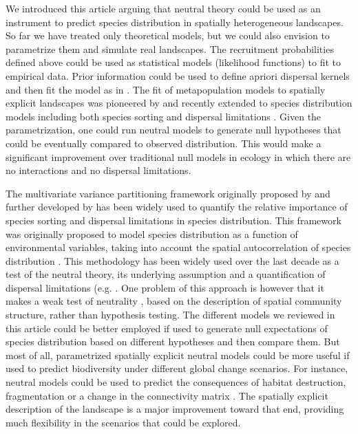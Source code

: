 \documentclass[12pt]{article}
\begin{document}
We introduced this article arguing that neutral theory could be used as an
instrument to predict species distribution in spatially heterogeneous
landscapes. So far we have treated only theoretical models, but we could also
envision to parametrize them and simulate real landscapes. The recruitment
probabilities defined above could be used as statistical models (likelihood
functions) to fit to empirical data. Prior information could be used to define
apriori dispersal kernels and then fit the model as in \textcite{Gravel2008}.
The fit of metapopulation models to spatially explicit landscapes was pioneered
by \textcite{Hanski1998} and recently extended to species distribution models
including both species sorting and dispersal limitations
\parencite{Boulangeat2012}. Given the parametrization, one could run neutral
models to generate null hypotheses that could be eventually compared to observed
distribution. This would make a significant improvement over traditional null
models in ecology \parencite{Gotelli1996} in which there are no interactions and no dispersal
limitations.

The multivariate variance partitioning framework originally proposed by
\textcite{Borcard1992} and further developed by \textcite{Borcard2002} has been
widely used to quantify the relative importance of species sorting and dispersal
limitations in species distribution. This framework was originally proposed to
model species distribution as a function of environmental variables, taking into
account the spatial autocorrelation of species distribution
\parencite{Leduc1992, Borcard1992, Legendre1993}. This methodology has been
widely used over the last decade as a test of the neutral theory, its underlying
assumption and a quantification of dispersal limitations (e.g.
\textcite{Svenning2004, Hardy2004, Gilbert2004, Cottenie2005}. One problem of
this approach is however that it makes a weak test of neutrality
\parencite{McGill2003}, based on the description of spatial community structure,
rather than hypothesis testing. The different models we reviewed in this article
could be better employed if used to generate null expectations of species
distribution based on different hypotheses and then compare them. But most of
all, parametrized spatially explicit neutral models could be more useful if used
to predict biodiversity under different global change scenarios. For instance,
neutral models could be used to predict the consequences of habitat destruction,
fragmentation or a change in the connectivity matrix \parencite{Hubbell2008}.
The spatially explicit description of the landscape is a major improvement
toward that end, providing much flexibility in the scenarios that could be
explored.
\end{document}
